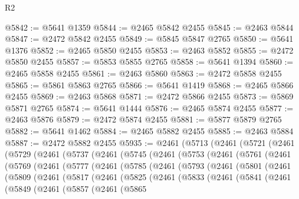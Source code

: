 \begin{lexlean}{R2}
\begin{coremodule}
@5842 := @5641 @1359
@5844 := @2465 @5842 @2455
@5845 := @2463 @5844
@5847 := @2472 @5842 @2455
@5849 := @5845 @5847 @2765
@5850 := @5641 @1376
@5852 := @2465 @5850 @2455
@5853 := @2463 @5852
@5855 := @2472 @5850 @2455
@5857 := @5853 @5855 @2765
@5858 := @5641 @1394
@5860 := @2465 @5858 @2455
@5861 := @2463 @5860
@5863 := @2472 @5858 @2455
@5865 := @5861 @5863 @2765
@5866 := @5641 @1419
@5868 := @2465 @5866 @2455
@5869 := @2463 @5868
@5871 := @2472 @5866 @2455
@5873 := @5869 @5871 @2765
@5874 := @5641 @1444
@5876 := @2465 @5874 @2455
@5877 := @2463 @5876
@5879 := @2472 @5874 @2455
@5881 := @5877 @5879 @2765
@5882 := @5641 @1462
@5884 := @2465 @5882 @2455
@5885 := @2463 @5884
@5887 := @2472 @5882 @2455
@5935 := @2461
    (@5713
      (@2461
        (@5721
          (@2461
            (@5729
              (@2461
                (@5737
                  (@2461
                    (@5745
                      (@2461
                        (@5753
                          (@2461
                            (@5761
                              (@2461
                                (@5769
                                  (@2461
                                    (@5777
                                      (@2461
                                        (@5785
                                          (@2461
                                            (@5793
                                              (@2461
                                                (@5801
                                                  (@2461
                                                    (@5809
                                                      (@2461
                                                        (@5817
                                                          (@2461
                                                            (@5825
                                                              (@2461
                                                                (@5833
                                                                  (@2461
                                                                    (@5841
                                                                      (@2461
                                                                        (@5849
                                                                          (@2461
                                                                            (@5857
                                                                              (@2461
                                                                                (@5865

\end{coremodule}
\end{lexlean}
